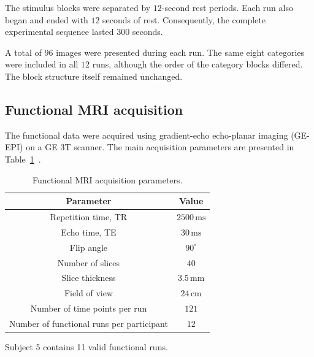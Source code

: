 \documentclass[english]{pwr_wmat_praca_dyplomowa}
\theoremstyle{definition}
\theoremstyle{remark}
\begin{document}
The stimulus blocks were separated by $12$-second rest periods. Each run also began and ended with $12$ seconds of rest. Consequently, the complete experimental sequence lasted $300$ seconds.

A total of $96$ images were presented during each run. The same eight categories were included in all $12$ runs, although the order of the category blocks differed. The block structure itself remained unchanged.

\newpage
\subsection{Functional MRI acquisition}
\label{section:fmri-acquisition}

The functional data were acquired using gradient-echo echo-planar imaging (GE-EPI) on a GE 3T scanner. The main acquisition parameters are presented in Table~\ref{tab:acquisition-params}~\cite{MAIN_DATASET}.

\begin{table}[ht]
    \centering
    \begin{threeparttable}
        \begin{tabular}{|c|c|}
            \hline
            Parameter & Value \\
            \hline
            Repetition time, TR & $2500\,\mathrm{ms}$ \\
            Echo time, TE & $30\,\mathrm{ms}$ \\
            Flip angle & $90^\circ$ \\
            Number of slices & $40$ \\
            Slice thickness & $3.5\,\mathrm{mm}$ \\
            Field of view & $24\,\mathrm{cm}$ \\
            Number of time points per run & $121$ \\
            Number of functional runs per participant & $12$\tnote{*} \\
            \hline
        \end{tabular}
        \begin{tablenotes}
            \footnotesize
            \item[*] Subject 5 contains 11 valid functional runs.
        \end{tablenotes}

        \caption{Functional MRI acquisition parameters.}
        \label{tab:acquisition-params}
    \end{threeparttable}
\end{table}
\end{document}
